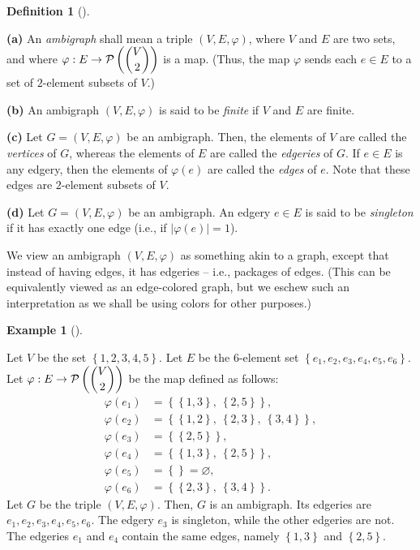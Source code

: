 \documentclass[numbers=enddot,12pt,final,onecolumn,notitlepage]{scrartcl}%
\theoremstyle{definition}
\newtheorem{defi}[theo]{Definition}
\newenvironment{definition}[1][]
{\begin{defi}[#1]\begin{leftbar}}
{\end{leftbar}\end{defi}}
\newtheorem{exmp}[theo]{Example}
\newenvironment{example}[1][]
{\begin{exmp}[#1]\begin{leftbar}}
{\end{leftbar}\end{exmp}}
\begin{document}
\begin{definition}
\label{def.ambigraph}\textbf{(a)} An \emph{ambigraph} shall mean a triple
$\left(  V,E,\varphi\right)  $, where $V$ and $E$ are two sets, and where
$\varphi:E\rightarrow\mathcal{P}\left(  \dbinom{V}{2}\right)  $ is a map.
(Thus, the map $\varphi$ sends each $e\in E$ to a set of $2$-element subsets
of $V$.)

\textbf{(b)} An ambigraph $\left(  V,E,\varphi\right)  $ is said to be
\emph{finite} if $V$ and $E$ are finite.

\textbf{(c)} Let $G=\left(  V,E,\varphi\right)  $ be an ambigraph. Then, the
elements of $V$ are called the \emph{vertices} of $G$, whereas the elements of
$E$ are called the \emph{edgeries} of $G$. If $e\in E$ is any edgery, then the
elements of $\varphi\left(  e\right)  $ are called the \emph{edges} of $e$.
Note that these edges are $2$-element subsets of $V$.

\textbf{(d)} Let $G=\left(  V,E,\varphi\right)  $ be an ambigraph. An edgery
$e\in E$ is said to be \emph{singleton} if it has exactly one edge (i.e., if
$\left\vert \varphi\left(  e\right)  \right\vert =1$).
\end{definition}

We view an ambigraph $\left(  V,E,\varphi\right)  $ as something akin to a
graph, except that instead of having edges, it has edgeries -- i.e., packages
of edges. (This can be equivalently viewed as an edge-colored graph, but we
eschew such an interpretation as we shall be using colors for other purposes.)

\begin{example}
\label{exa.ambigraph.1}Let $V$ be the set $\left\{  1,2,3,4,5\right\}  $. Let
$E$ be the $6$-element set $\left\{  e_{1},e_{2},e_{3},e_{4},e_{5}%
,e_{6}\right\}  $. Let $\varphi:E\rightarrow\mathcal{P}\left(  \dbinom{V}%
{2}\right)  $ be the map defined as follows:%
\begin{align*}
\varphi\left(  e_{1}\right)   &  =\left\{  \left\{  1,3\right\}  ,\ \left\{
2,5\right\}  \right\}  ,\\
\varphi\left(  e_{2}\right)   &  =\left\{  \left\{  1,2\right\}  ,\ \left\{
2,3\right\}  ,\ \left\{  3,4\right\}  \right\}  ,\\
\varphi\left(  e_{3}\right)   &  =\left\{  \left\{  2,5\right\}  \right\}  ,\\
\varphi\left(  e_{4}\right)   &  =\left\{  \left\{  1,3\right\}  ,\ \left\{
2,5\right\}  \right\}  ,\\
\varphi\left(  e_{5}\right)   &  =\left\{  {}\right\}  =\varnothing,\\
\varphi\left(  e_{6}\right)   &  =\left\{  \left\{  2,3\right\}  ,\ \left\{
3,4\right\}  \right\}  .
\end{align*}
Let $G$ be the triple $\left(  V,E,\varphi\right)  $. Then, $G$ is an
ambigraph. Its edgeries are $e_{1},e_{2},e_{3},e_{4},e_{5},e_{6}$. The edgery
$e_{3}$ is singleton, while the other edgeries are not. The edgeries $e_{1}$
and $e_{4}$ contain the same edges, namely $\left\{  1,3\right\}  $ and
$\left\{  2,5\right\}  $.
\end{example}
\end{document}
